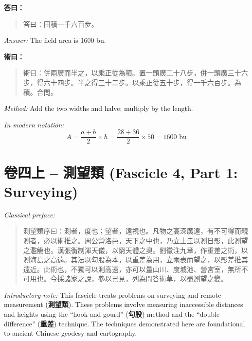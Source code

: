 \documentclass[11pt,a4paper]{article}
\newenvironment{answer}{%
  \medskip\noindent{\color{answercolor}\rule{0.5\textwidth}{0.5pt}}%
  \par\color{answercolor}%
}{%
  \par\medskip%
}
\newenvironment{method}{%
  \medskip\noindent{\color{methodcolor}\rule{0.5\textwidth}{0.5pt}}%
  \par\color{methodcolor}%
}{%
  \par\medskip%
}
\begin{document}
\begin{answer}
\textbf{答曰：}

\begin{quote}
\textcolor{chinacolor}{%
答曰：田積一千六百步。
}
\end{quote}

\textit{Answer:} The field area is 1600 bu.
\end{answer}

\begin{method}
\textbf{術曰：}

\begin{quote}
\textcolor{chinacolor}{%
術曰：併兩廣而半之，以乘正從為積。置一頭廣二十八步，併一頭廣三十六步，得六十四步。半之得三十二步。以乘正從五十步，得一千六百步。為積。合問。
}
\end{quote}

\textit{Method:} Add the two widths and halve; multiply by the length.

\medskip
\textit{In modern notation:}
\[
A = \frac{a+b}{2} \times h = \frac{28+36}{2} \times 50 = 1600 \text{ bu}
\]
\end{method}

\newpage

\section{卷四上 -- 測望類 (Fascicle 4, Part 1: Surveying)}
\label{sec:juan4shang}

\noindent\textit{Classical preface:}
\begin{quote}
\textcolor{chinacolor}{%
測望類序曰：測者，度也；望者，遠視也。凡物之高深廣遠，有不可得而親測者，必以術推之。周公營洛邑，天下之中也，乃立土圭以測日影，此測望之濫觴也。漢張衡制渾天儀，以窮天體之奧。劉徽注九章，作重差之術，以測海島之高遠。其法以勾股為本，以重差為用，立兩表而望之，以影差推其遠近。此術也，不獨可以測高遠，亦可以量山川、度城池、營宮室，無所不可用也。今採諸家之說，參以己見，列為問答術草，以盡測望之變。
}
\end{quote}

\noindent\textit{Introductory note:} This fascicle treats problems on 
surveying and remote measurement (\textbf{測望類}). These problems involve measuring 
inaccessible distances and heights using the ``hook-and-gourd'' (\textbf{勾股}) 
method and the ``double difference'' (\textbf{重差}) technique. The techniques demonstrated here are 
foundational to ancient Chinese geodesy and cartography.
\end{document}
